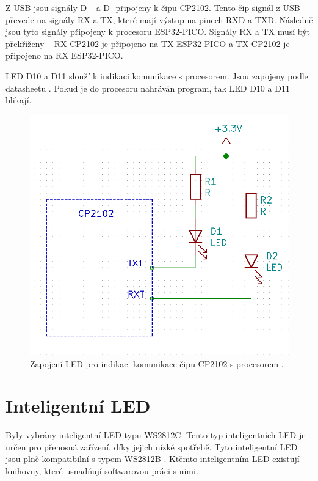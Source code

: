 Z USB jsou signály D+ a D- připojeny k čipu CP2102. Tento čip signál z USB převede na signály RX a TX, které mají výstup 
na pinech RXD a TXD. Následně jsou tyto signály připojeny k procesoru ESP32-PICO. Signály RX a TX musí být překříženy – RX 
CP2102 je připojeno na TX ESP32-PICO a TX CP2102 je připojeno na RX ESP32-PICO. 

LED D10 a D11 slouží k indikaci komunikace s procesorem. Jsou zapojeny podle datasheetu \cite{CP2102_datasheet}. Pokud je do 
procesoru nahráván program, tak LED D10 a D11 blikají.

\begin{figure}[!h]
    \begin{center}
      \includegraphics[scale=0.5]{obrazky/CP2102_LED.png}
    \end{center}
    \caption[Zapojení LED pro indikaci komunikace čipu CP2102 s procesorem]{Zapojení LED pro indikaci komunikace čipu CP2102 s procesorem \cite{CP2102_datasheet}.}
\end{figure}

\section{Inteligentní LED}
Byly vybrány inteligentní LED typu WS2812C. Tento typ inteligentních LED je určen pro přenosná zařízení, díky jejich nízké 
spotřebě. Tyto inteligentní LED jsou plně kompatibilní s typem WS2812B \cite{WS2812C_datasheet}. Ktěmto inteligentním LED 
existují knihovny, které usnadňují softwarovou práci s nimi.

